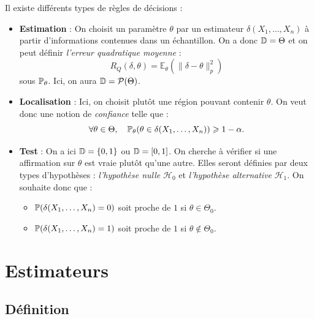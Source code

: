 \begin{proposition}
    Il existe différents types de règles de décisions : 
    \begin{itemize}
        \item \textbf{Estimation} : On choisit un paramètre $ \theta$ par un 
        estimateur $ \delta(X_1, \dots, X_n)$ à partir d'informations contenues 
        dans un échantillon. On a donc $ \mathbb{D} = \Theta$ et on peut définir 
        \emph{l'erreur quadratique moyenne} : 
            $$ R_Q( \delta, \theta) = \mathbb{E}_\theta( \| \delta - \theta\|_p^2) $$
        sous $ \mathbb{P}_\theta$. Ici, on aura $ \mathbb{D} = \mathcal{P}( \Theta)$. 
        \item \textbf{Localisation} : Ici, on choisit plutôt une région pouvant contenir 
        $ \theta$. On veut donc une notion de \emph{confiance} telle que : 
            $$ \forall \theta \in \Theta, \quad \mathbb{P}_\theta ( \theta \in \delta(X_1, \dots, X_n)) \geqslant 1 - \alpha. $$
        \item \textbf{Test} : On a ici $ \mathbb{D} = \{0,1\}$ ou $ \mathbb{D} = [0,1]$. On cherche 
        à vérifier si une affirmation sur $ \theta$ est vraie plutôt qu'une autre. 
        Elles seront définies par deux types d'hypothèses : \emph{l'hypothèse nulle} $ \mathcal{H}_0$ et 
        \emph{l'hypothèse alternative} $ \mathcal{H}_1$.
        On souhaite donc que : 
            \begin{itemize}
                \item $ \mathbb{P}( \delta(X_1, \dots, X_n) = 0) $ soit proche de $1$ si $ \theta \in \Theta_0$. 
                \item $ \mathbb{P}( \delta(X_1, \dots, X_n) = 1) $ soit proche de $1$ si $ \theta \not \in \Theta_0$. 
            \end{itemize} 
    \end{itemize}
\end{proposition}


\section{Estimateurs}

\subsection{Définition}

